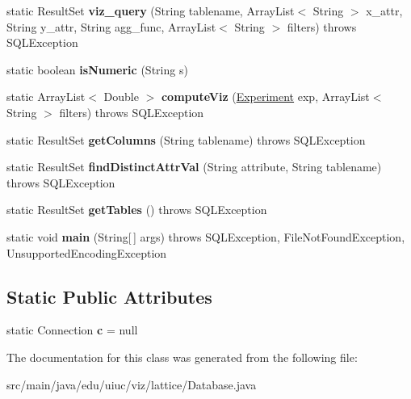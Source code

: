 \begin{DoxyCompactItemize}
static Result\+Set {\bfseries viz\+\_\+query} (String tablename, Array\+List$<$ String $>$ x\+\_\+attr, String y\+\_\+attr, String agg\+\_\+func, Array\+List$<$ String $>$ filters)  throws S\+Q\+L\+Exception 
\item 
\mbox{\label{classedu_1_1uiuc_1_1viz_1_1lattice_1_1_database_aefb44964489e83df40f17a0a37f54b31}} 
static boolean {\bfseries is\+Numeric} (String s)
\item 
\mbox{\label{classedu_1_1uiuc_1_1viz_1_1lattice_1_1_database_ac1958281cf3de5669030dbdf1a9a48f2}} 
static Array\+List$<$ Double $>$ {\bfseries compute\+Viz} (\mbox{\hyperlink{classedu_1_1uiuc_1_1viz_1_1algorithms_1_1_experiment}{Experiment}} exp, Array\+List$<$ String $>$ filters)  throws S\+Q\+L\+Exception 
\item 
\mbox{\label{classedu_1_1uiuc_1_1viz_1_1lattice_1_1_database_aa3719cbaf0e7b9e83d9d2b5d2e886e71}} 
static Result\+Set {\bfseries get\+Columns} (String tablename)  throws S\+Q\+L\+Exception 
\item 
\mbox{\label{classedu_1_1uiuc_1_1viz_1_1lattice_1_1_database_a9689e434eeac376dc2d6335f305560cc}} 
static Result\+Set {\bfseries find\+Distinct\+Attr\+Val} (String attribute, String tablename)  throws S\+Q\+L\+Exception 
\item 
\mbox{\label{classedu_1_1uiuc_1_1viz_1_1lattice_1_1_database_a5c81d0679259b6824f1fa55dd24ae568}} 
static Result\+Set {\bfseries get\+Tables} ()  throws S\+Q\+L\+Exception 
\item 
\mbox{\label{classedu_1_1uiuc_1_1viz_1_1lattice_1_1_database_a551e56371cfa57867e6dbe3c615bacda}} 
static void {\bfseries main} (String\mbox{[}$\,$\mbox{]} args)  throws S\+Q\+L\+Exception, File\+Not\+Found\+Exception, Unsupported\+Encoding\+Exception      
\end{DoxyCompactItemize}
\subsection*{Static Public Attributes}
\begin{DoxyCompactItemize}
\item 
\mbox{\label{classedu_1_1uiuc_1_1viz_1_1lattice_1_1_database_ac75309efa3806cd99e152ddec8d78e60}} 
static Connection {\bfseries c} = null
\end{DoxyCompactItemize}


The documentation for this class was generated from the following file\+:\begin{DoxyCompactItemize}
\item 
src/main/java/edu/uiuc/viz/lattice/Database.\+java\end{DoxyCompactItemize}
